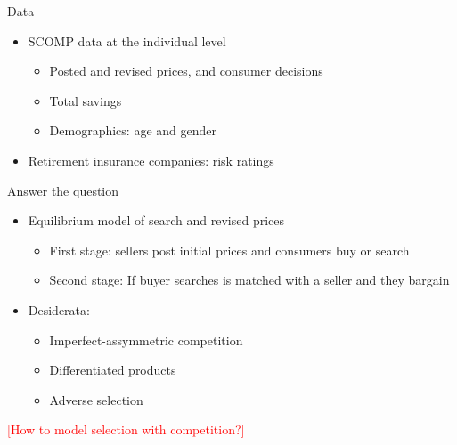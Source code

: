 \documentclass[10pt,aspectratio=169]{beamer}
\begin{document}
 \begin{frame}{Data} \label{slide:data}
\begin{itemize}
    \item SCOMP data at the individual level  
    \begin{itemize}
        \item Posted and revised prices, and consumer decisions 
        \item Total savings 
        \item Demographics: age and gender \hyperlink{slide:fig5}{}
    \end{itemize}
     \item Retirement insurance companies: risk ratings
\end{itemize}
\end{frame}

\begin{frame}{Answer the question}\label{slide:answer1}
    \begin{itemize}
        \item Equilibrium model of search and revised prices  
        \begin{itemize}
            \item First stage: sellers post initial prices and consumers buy or search 
            \item Second stage: If buyer searches is matched with a seller and they bargain
        \end{itemize}
        \item Desiderata:
        \begin{itemize}
           \item Imperfect-assymmetric competition\hyperlink{slide:fig2}{}
            \item Differentiated products   \hyperlink{slide:fig3}{}
            \item Adverse selection
        \end{itemize}
    \end{itemize}

    \textcolor{red}{[How to model selection with competition?]}
\end{frame}
\end{document}
